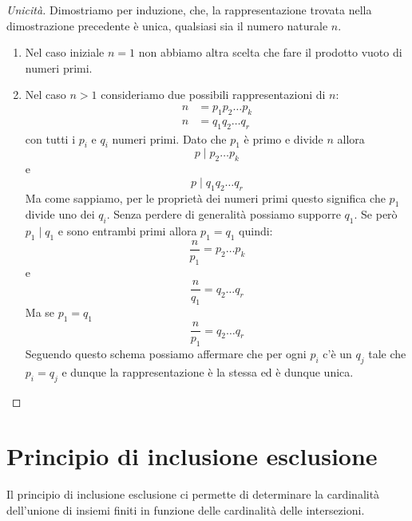 \begin{theorem}
	\begin{proof}[Unicit\`a]
		Dimostriamo per induzione, che, la rappresentazione trovata nella dimostrazione
		precedente \`e unica, qualsiasi sia il numero naturale $n$.
		\begin{enumerate}
			\item Nel caso iniziale $n = 1$ non abbiamo altra scelta che fare il prodotto vuoto
			      di numeri primi.
			\item Nel caso $n > 1$ consideriamo due possibili rappresentazioni di $n$:
			      \begin{equation*}
				      \begin{array}{ll}
					      n & = p_1 p_2 \dots p_k \\
					      n & = q_1 q_2 \dots q_r
				      \end{array}
			      \end{equation*}
			      con tutti i $p_i$ e $q_i$ numeri primi.
			      Dato che $p_1$ \`e primo e divide $n$ allora
			      \begin{equation*}
				      p \mid p_2 \dots p_k
			      \end{equation*}
			      e
			      \begin{equation*}
				      p \mid q_1 q_2 \dots q_r
			      \end{equation*}
			      Ma come sappiamo, per le propriet\`a dei numeri primi questo significa che
			      $p_1$ divide uno dei $q_i$. Senza perdere di generalit\`a possiamo supporre
			      $q_1$. Se per\`o $p_1 \mid q_1$ e sono entrambi primi allora $p_1 = q_1$ quindi:
			      \begin{equation*}
				      \frac{n}{p_1} = p_2 \dots p_k
			      \end{equation*}
			      e
			      \begin{equation*}
				      \frac{n}{q_1} = q_2 \dots q_r
			      \end{equation*}
			      Ma se $p_1 = q_1$
			      \begin{equation*}
				      \frac{n}{p_1} = q_2 \dots q_r
			      \end{equation*}
			      Seguendo questo schema possiamo affermare che per ogni $p_i$ c'\`e un $q_j$
			      tale che $p_i = q_j$ e dunque la rappresentazione \`e la stessa ed \`e dunque
			      unica.
		\end{enumerate}
	\end{proof}
\end{theorem}

\section{Principio di inclusione esclusione}
Il principio di inclusione esclusione ci permette di determinare la cardinalit\`a dell'unione
di insiemi finiti in funzione delle cardinalit\`a delle intersezioni.

